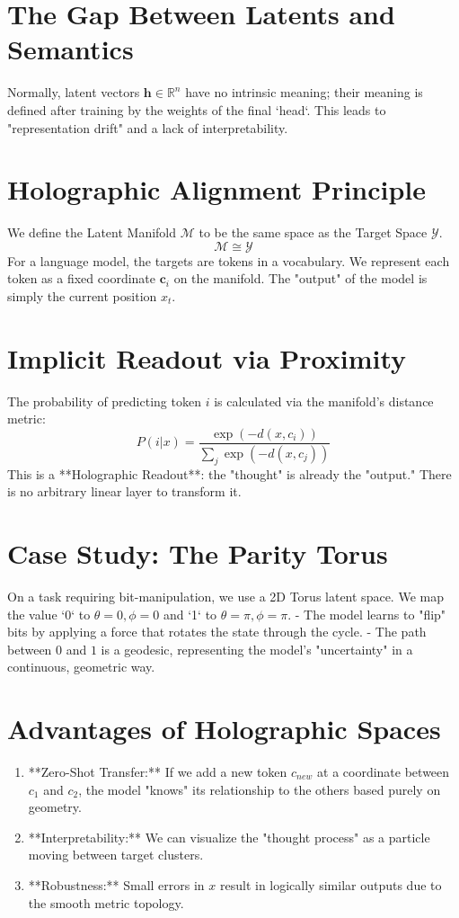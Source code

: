 \documentclass[11pt,a4paper]{report}
\begin{document}
\section{The Gap Between Latents and Semantics}
Normally, latent vectors $\mathbf{h} \in \mathbb{R}^n$ have no intrinsic meaning; their meaning is defined after training by the weights of the final `head`. This leads to "representation drift" and a lack of interpretability.

\section{Holographic Alignment Principle}
We define the Latent Manifold $\mathcal{M}$ to be the same space as the Target Space $\mathcal{Y}$.
\begin{equation}
    \mathcal{M} \cong \mathcal{Y}
\end{equation}
For a language model, the targets are tokens in a vocabulary. We represent each token as a fixed coordinate $\mathbf{c}_i$ on the manifold. The "output" of the model is simply the current position $x_t$.

\section{Implicit Readout via Proximity}
The probability of predicting token $i$ is calculated via the manifold's distance metric:
\begin{equation}
    P(i|x) = \frac{\exp(-d(x, c_i))}{\sum_j \exp(-d(x, c_j))}
\end{equation}
This is a **Holographic Readout**: the "thought" is already the "output." There is no arbitrary linear layer to transform it.

\section{Case Study: The Parity Torus}
On a task requiring bit-manipulation, we use a 2D Torus latent space. We map the value `0` to $\theta=0, \phi=0$ and `1` to $\theta=\pi, \phi=\pi$.
- The model learns to "flip" bits by applying a force that rotates the state through the cycle.
- The path between $0$ and $1$ is a geodesic, representing the model's "uncertainty" in a continuous, geometric way.

\section{Advantages of Holographic Spaces}
\begin{enumerate}
    \item **Zero-Shot Transfer:** If we add a new token $c_{new}$ at a coordinate between $c_1$ and $c_2$, the model "knows" its relationship to the others based purely on geometry.
    \item **Interpretability:** We can visualize the "thought process" as a particle moving between target clusters.
    \item **Robustness:** Small errors in $x$ result in logically similar outputs due to the smooth metric topology.
\end{enumerate}
\end{document}
